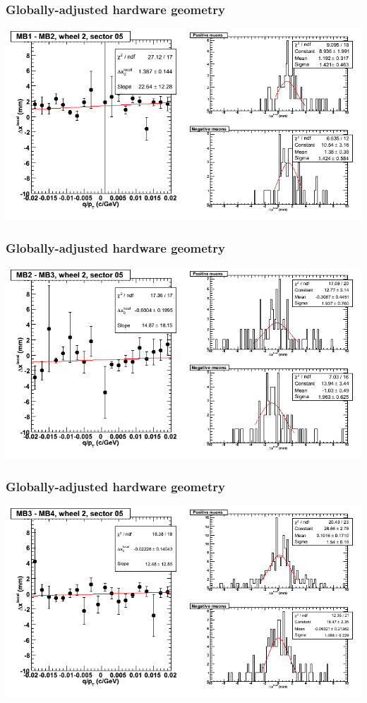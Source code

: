 \documentclass[compress]{beamer}
\begin{document}
\begin{frame}
\frametitle{Globally-adjusted hardware geometry}
\includegraphics[width=\linewidth]{NOV4_segdiffs_HW/dt13_resid_E_05_12.png}
\end{frame}

\begin{frame}
\frametitle{Globally-adjusted hardware geometry}
\includegraphics[width=\linewidth]{NOV4_segdiffs_HW/dt13_resid_E_05_23.png}
\end{frame}

\begin{frame}
\frametitle{Globally-adjusted hardware geometry}
\includegraphics[width=\linewidth]{NOV4_segdiffs_HW/dt13_resid_E_05_34.png}
\end{frame}
\end{document}
